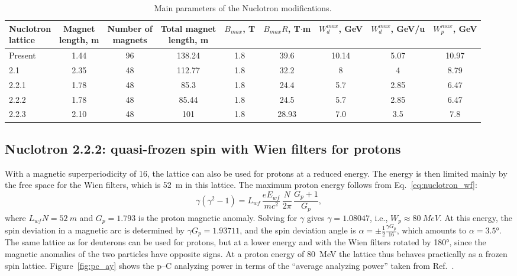 \documentclass[%
  aps,
  pra,
  preprint,
  a4paper,
  amsmath,
  amssymb,
  floatfix,
  longbibliography,
  superscriptaddress
]{revtex4-2}
\begin{document}
\begin{table}[htbp]
  \centering
  \caption{Main parameters of the Nuclotron modifications.}
  \label{tab:nuclotron}
  \footnotesize
  \setlength{\tabcolsep}{2.5pt}
  \begin{tabular}{lcccccccc}
    \toprule
    \makecell[l]{Nuclotron\\lattice} & \makecell{Magnet\\length, m} & \makecell{Number of\\magnets}
      & \makecell{Total magnet\\length, m} & \makecell{$B_{max}$,\\T}
      & \makecell{$B_{max}R$,\\T$\cdot$m} & \makecell{$W_d^{max}$,\\GeV}
      & \makecell{$W_d^{max}$,\\GeV/u} & \makecell{$W_p^{max}$,\\GeV} \\
    \midrule
    Present & 1.44 & 96 & 138.24 & 1.8 & 39.6  & 10.14 & 5.07 & 10.97 \\
    2.1     & 2.35 & 48 & 112.77 & 1.8 & 32.2  & 8     & 4    & 8.79 \\
    2.2.1   & 1.78 & 48 & 85.3   & 1.8 & 24.4  & 5.7   & 2.85 & 6.47 \\
    2.2.2   & 1.78 & 48 & 85.44  & 1.8 & 24.5  & 5.7   & 2.85 & 6.47 \\
    2.2.3   & 2.10 & 48 & 101    & 1.8 & 28.93 & 7.0   & 3.5  & 7.8 \\
    \bottomrule
  \end{tabular}
\end{table}

\subsection{Nuclotron 2.2.2: quasi-frozen spin with Wien filters for protons}

With a magnetic superperiodicity of 16, the lattice can also be used for
protons at a reduced energy. The energy is then limited mainly by the free
space for the Wien filters, which is \SI{52}{m} in this lattice. The maximum
proton energy follows from Eq.~\eqref{eq:nuclotron_wf}:
\begin{equation}
  \gamma(\gamma^2-1) = L_{wf}\,\frac{eE_{wf}}{mc^2}\,\frac{N}{2\pi}\,\frac{G_p+1}{G_p},
\end{equation}
where $L_{wf}N = \SI{52}{m}$ and $G_p = 1.793$ is the proton magnetic anomaly.
Solving for $\gamma$ gives $\gamma = 1.08047$, i.e., $W_p\approx\SI{80}{MeV}$.
At this energy, the spin deviation in a magnetic arc is determined by
$\gamma G_p = 1.93711$, and the spin deviation angle is
$\alpha = \pm\frac{1}{2}\frac{\gamma G_p}{16}$, which amounts to
$\alpha = \ang{3.5}$.
The same lattice as for deuterons can be used for protons, but at a lower
energy and with the Wien filters rotated by \ang{180}, since the magnetic
anomalies of the two particles have opposite signs. At a proton energy of
\SI{80}{MeV} the lattice thus behaves practically as a frozen spin lattice.
Figure~\ref{fig:pc_ay} shows the p--C analyzing power in terms of the
``average analyzing power'' taken from Ref.~\cite{Mcnaughton:1985wyt}.
\end{document}
